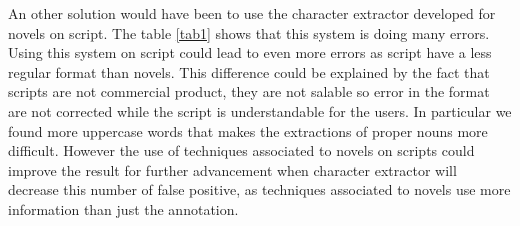 \documentclass[a4paper, 12pt]{report}
\begin{document}
An other solution would have been to use the character extractor developed for novels on script. The table \ref{tab1} shows that this system is  doing many errors. Using this system on script could lead to even more errors as script have a less regular format than novels. This difference could be explained by the fact that scripts are not commercial product, they are not salable so error in the format are not corrected while the script is understandable for the users. In particular we found more uppercase words that makes the extractions of proper nouns more difficult. However the use of techniques associated to novels on scripts could improve the result for further advancement when character extractor will decrease this number of false positive, as techniques associated to novels use more information than just the annotation.\\
\end{document}
